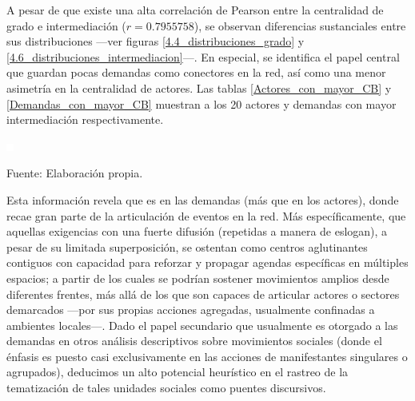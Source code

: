 \documentclass[letterpaper, 11pt]{book}
\theoremstyle{definition}
\theoremstyle{remark}
\begin{document}
A pesar de que existe una alta correlación de Pearson entre la centralidad de grado e intermediación ($r = 0.7955758$), se observan diferencias sustanciales entre sus distribuciones ---ver figuras \ref{4.4_distribuciones_grado} y \ref{4.6_distribuciones_intermediacion}---. 
En especial, se identifica el papel central que guardan pocas demandas como conectores en la red, así como una menor asimetría en la centralidad de actores. 
Las tablas \ref{Actores_con_mayor_CB} y \ref{Demandas_con_mayor_CB} muestran a los 20 actores y demandas con mayor intermediación respectivamente. 

\newpage
\hspace{-1.5em} \begin{minipage}{\linewidth}
\centering\bigskip
{} \label{4_5_cIntermediacion}

\includegraphics[scale=0.1]{img/null.png}
\vspace{36em}
\par\bigskip
\small Fuente: Elaboración propia.
\end{minipage}\bigskip



Esta información revela que es en las demandas (más que en los actores), donde recae gran parte de la articulación de eventos en la red. 
Más específicamente, que aquellas exigencias con una fuerte difusión (repetidas a manera de eslogan), a pesar de su limitada superposición, se ostentan como centros aglutinantes contiguos con capacidad para reforzar y propagar agendas específicas en múltiples espacios; a partir de los cuales se podrían sostener movimientos amplios desde diferentes frentes, más allá de los que son capaces de articular actores o sectores demarcados ---por sus propias acciones agregadas, usualmente confinadas a ambientes locales---. 
Dado el papel secundario que usualmente es otorgado a las demandas en otros análisis descriptivos sobre movimientos sociales (donde el énfasis es puesto casi exclusivamente en las acciones de manifestantes singulares o agrupados), deducimos un alto potencial heurístico en el rastreo de la tematización de tales unidades sociales como puentes discursivos. 
\end{document}

